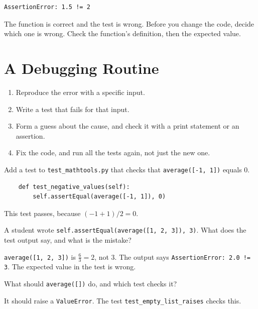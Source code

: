 \begin{verbatim}
AssertionError: 1.5 != 2
\end{verbatim}

The function is correct and the test is wrong. Before you change the code,
decide which one is wrong. Check the function's definition, then the expected
value.

\section{A Debugging Routine}
\begin{enumerate}
\item Reproduce the error with a specific input.
\item Write a test that fails for that input.
\item Form a guess about the cause, and check it with a print statement or an assertion.
\item Fix the code, and run all the tests again, not just the new one.
\end{enumerate}

\begin{Exercise}[label=test1, title=Write a test]
Add a test to \texttt{test\_mathtools.py} that checks that \texttt{average([-1, 1])} equals 0.
\end{Exercise}
\begin{Answer}[ref=test1]
\begin{verbatim}
    def test_negative_values(self):
        self.assertEqual(average([-1, 1]), 0)
\end{verbatim}
This test passes, because $(-1 + 1) / 2 = 0$.
\end{Answer}

\begin{Exercise}[label=test2, title=Which test fails?]
A student wrote \texttt{self.assertEqual(average([1, 2, 3]), 3)}. What does the
test output say, and what is the mistake?
\end{Exercise}
\begin{Answer}[ref=test2]
\texttt{average([1, 2, 3])} is $\frac{6}{3} = 2$, not 3. The output says
\texttt{AssertionError: 2.0 != 3}. The expected value in the test is wrong.
\end{Answer}

\begin{Exercise}[label=test3, title=Edge case]
What should \texttt{average([])} do, and which test checks it?
\end{Exercise}
\begin{Answer}[ref=test3]
It should raise a \texttt{ValueError}. The test \texttt{test\_empty\_list\_raises}
checks this.
\end{Answer}
